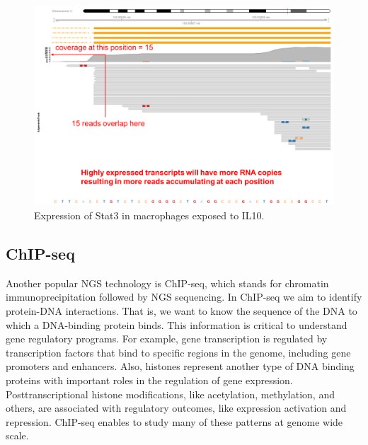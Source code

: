 \documentclass[]{book}
\theoremstyle{definition}
\theoremstyle{definition}
\theoremstyle{definition}
\theoremstyle{remark}
\begin{document}
\begin{figure}
\includegraphics[width=20.83in]{pic/stat3_rnaseq_4} \caption{Expression of Stat3 in macrophages exposed to IL10.}\label{fig:stat3-rnaseq-4}
\end{figure}

\subsection{ChIP-seq}\label{chip-seq}

Another popular NGS technology is ChIP-seq, which stands for chromatin
immunoprecipitation followed by NGS sequencing. In ChIP-seq we aim to
identify protein-DNA interactions. That is, we want to know the sequence
of the DNA to which a DNA-binding protein binds. This information is
critical to understand gene regulatory programs. For example, gene
transcription is regulated by transcription factors that bind to
specific regions in the genome, including gene promoters and enhancers.
Also, histones represent another type of DNA binding proteins with
important roles in the regulation of gene expression.
Posttranscriptional histone modifications, like acetylation,
methylation, and others, are associated with regulatory outcomes, like
expression activation and repression. ChIP-seq enables to study many of
these patterns at genome wide scale.
\end{document}
